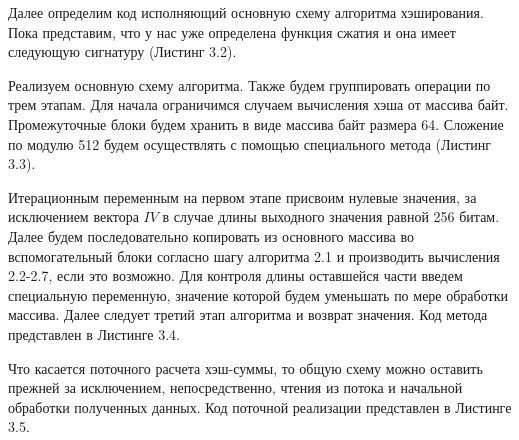 

\par
Далее определим код исполняющий основную схему алгоритма хэширования. Пока представим, что у нас уже определена функция сжатия и она имеет следующую сигнатуру (Листинг 3.2).

\par
Реализуем основную схему алгоритма. Также будем группировать операции по трем этапам. Для начала ограничимся случаем вычисления хэша от массива байт. Промежуточные блоки будем хранить в виде массива байт размера 64. Сложение по модулю 512 будем осуществлять с помощью специального метода (Листинг 3.3).

\par
Итерационным переменным на первом этапе присвоим нулевые значения, за исключением вектора $IV$ в случае длины выходного значения равной 256 битам. Далее будем последовательно копировать из основного массива во вспомогательный блоки согласно шагу алгоритма 2.1 и производить вычисления 2.2-2.7, если это возможно. Для контроля длины оставшейся части введем специальную переменную, значение которой будем уменьшать по мере обработки массива. Далее следует третий этап алгоритма и возврат значения. Код метода представлен в Листинге 3.4.

\par
Что касается поточного расчета хэш-суммы, то общую схему можно оставить прежней за исключением, непосредственно, чтения из потока и начальной обработки полученных данных. Код поточной реализации представлен в Листинге 3.5.


